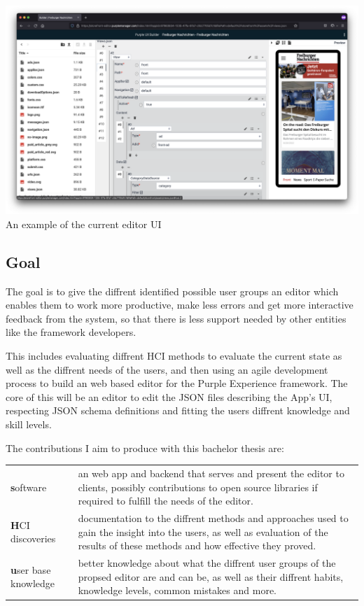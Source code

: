 \includegraphics[width=\textwidth]{pics/current_editor.png}
An example of the current editor UI

\subsection{Goal}
\label{subsec:goal}
The goal is to give the diffrent identified possible user groups an editor
which enables them to work more productive, make less errors and get more interactive feedback from the system,
so that there is less support needed by other entities like the framework developers.

This includes evaluating diffrent HCI methods to evaluate the current state as well as the diffrent needs of the users,
and then using an agile development process to build an web based editor for the Purple Experience framework.
The core of this will be an editor to edit the JSON files describing the App's UI, respecting JSON schema definitions
and fitting the users diffrent knowledge and skill levels.

The contributions I aim to produce with this bachelor thesis are:

\begin{tabular}[]{>{\textbf}l l}
  software & an web app and backend that serves and present the editor to clients, possibly contributions to open source libraries if required to fulfill the needs of the editor.\\
  HCI discoveries & documentation to the diffrent methods and approaches used to gain the insight into the users, as well as evaluation of the results of these methods and how effective they proved.\\
  user base knowledge & better knowledge about what the diffrent user groups of the propsed editor are and can be, as well as their diffrent habits, knowledge levels, common mistakes and more.\\
  
\end{tabular}

